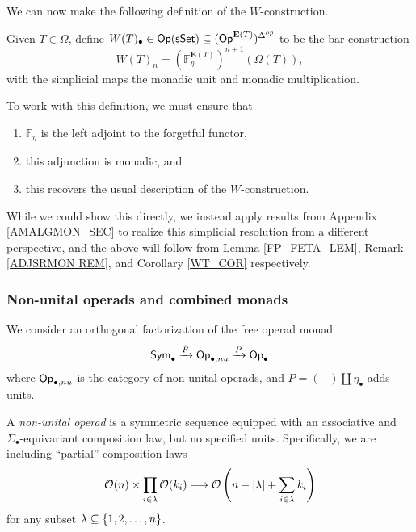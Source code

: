 \documentclass[a4paper,10pt
,draft
]{article}%
\renewcommand{\1}{\eta}%
\begin{document}
We can now make the following definition of the $W$-construction.

\begin{definition}
      Given $T \in \Omega$, define $W(T)_\bullet \in \mathsf{Op}(\mathsf{sSet}) \subseteq (\mathsf{Op}^{\mathbf E(T)})^{\Delta^{op}}$ to be the bar construction
      \[
            W(T)_n = \left( \mathbb F^{\mathbf E(T)}_\eta \right)^{n+1} \left(\Omega(T)\right),
      \]
      with the simplicial maps the monadic unit and monadic multiplication.
\end{definition}

To work with this definition, we must ensure that
\begin{enumerate}
\item $\mathbb F_\eta$ is the left adjoint to the forgetful functor,
\item this adjunction is monadic, and
\item this recovers the usual description of the $W$-construction.
\end{enumerate}
While we could show this directly, we instead apply results from Appendix \ref{AMALGMON_SEC} to realize this simplicial resolution from a different perspective,
and the above will follow from Lemma \ref{FP_FETA_LEM}, Remark \ref{ADJSRMON REM}, and Corollary \ref{WT_COR} respectively.

\subsubsection{Non-unital operads and combined monads}

We consider an orthogonal factorization of the free operad monad
\[
      \mathsf{Sym}_\bullet \xrightarrow{\bar F} \mathsf{Op}_{\bullet,nu} \xrightarrow{P} \mathsf{Op}_\bullet
\]
where $\mathsf{Op}_{\bullet,nu}$ is the category of non-unital operads, and $P = (-) \amalg \eta_\bullet$ adds units.

\begin{definition}
      A \textit{non-unital operad} is a symmetric sequence equipped with an associative and $\Sigma_\bullet$-equivariant composition law, but no specified units.
      Specifically, we are including ``partial'' composition laws
      \[
            \mathcal{O}(n) \times \prod_{i \in \lambda} \mathcal{O}(k_i) \longrightarrow \mathcal{O}\left(n-|\lambda|+\sum_{i \in \lambda}k_i\right)
      \]
      for any subset $\lambda \subseteq \left\{1,2,\dots,n\right\}$.
\end{definition}
\end{document}
